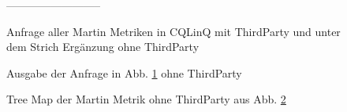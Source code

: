 \documentclass[12pt]{article}
\begin{document}
\begin{figure} 
  \centering
  --------------------------
  \caption{Anfrage aller Martin Metriken in CQLinQ mit ThirdParty
  und unter dem Strich Ergänzung ohne ThirdParty}
  \label{fig:martinAnfrage}
\end{figure}

\begin{figure} 
  \centering
  \caption{Ausgabe der Anfrage in Abb. \ref{fig:martinAnfrage}
  ohne ThirdParty}
  \label{fig:martinResultOhneThirdParty}
\end{figure}

\begin{figure} 
  \centering
  \caption{Tree Map der Martin Metrik ohne ThirdParty aus Abb.
          \ref{fig:martinResultOhneThirdParty}}
  \label{fig:martin}
\end{figure}
\end{document}
